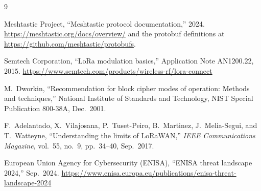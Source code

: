 \documentclass[conference,a4paper,10pt]{IEEEtran}
\begin{document}
\begin{thebibliography}{9}

Meshtastic Project, ``Meshtastic protocol documentation,'' 2024.
\url{https://meshtastic.org/docs/overview/} and the protobuf
definitions at \url{https://github.com/meshtastic/protobufs}.

Semtech Corporation, ``LoRa modulation basics,'' Application Note
AN1200.22, 2015.
\url{https://www.semtech.com/products/wireless-rf/lora-connect}

M.~Dworkin, ``Recommendation for block cipher modes of operation:
Methods and techniques,'' National Institute of Standards and
Technology, NIST Special Publication 800-38A, Dec.\ 2001.

F.~Adelantado, X.~Vilajosana, P.~Tuset-Peiro, B.~Martinez,
J.~Melia-Segui, and T.~Watteyne, ``Understanding the limits of
LoRaWAN,'' \emph{IEEE Communications Magazine}, vol.~55, no.~9,
pp.~34--40, Sep.\ 2017.

European Union Agency for Cybersecurity (ENISA), ``ENISA threat
landscape 2024,'' Sep.\ 2024.
\url{https://www.enisa.europa.eu/publications/enisa-threat-landscape-2024}

\end{thebibliography}
\end{document}
